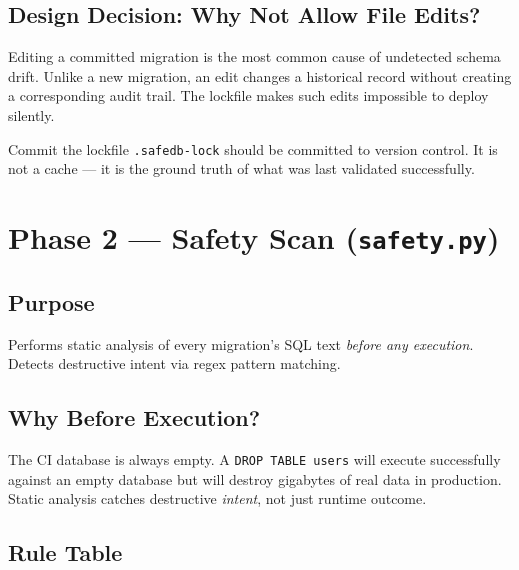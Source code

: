 \documentclass[12pt,a4paper]{report}
\begin{document}
\subsection{Design Decision: Why Not Allow File Edits?}

Editing a committed migration is the most common cause of undetected schema drift.
Unlike a new migration, an edit changes a historical record without creating a
corresponding audit trail. The lockfile makes such edits impossible to deploy
silently.

\begin{infobox}{Commit the lockfile}
\texttt{.safedb-lock} should be committed to version control. It is not a cache —
it is the ground truth of what was last validated successfully.
\end{infobox}

\section{Phase 2 — Safety Scan (\texttt{safety.py})}

\subsection{Purpose}

Performs static analysis of every migration's SQL text \emph{before any
execution}. Detects destructive intent via regex pattern matching.

\subsection{Why Before Execution?}

The CI database is always empty. A \texttt{DROP TABLE users} will execute
successfully against an empty database but will destroy gigabytes of real data
in production. Static analysis catches destructive \emph{intent}, not just
runtime outcome.

\subsection{Rule Table}
\end{document}
